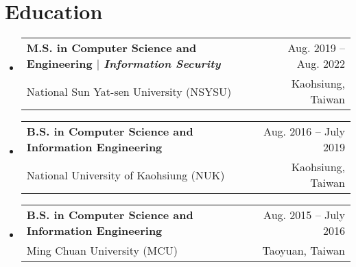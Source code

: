 \documentclass[A4,11pt]{article}
\makeatletter
\newcommand{\CVSubheading}[4]{
  \vspace{-2pt}\item
    \begin{tabular*}{0.97\textwidth}[t]{l@{\extracolsep{\fill}}r}
      \textbf{#1} & #2 \\
      \small#3 & \small #4 \\
    \end{tabular*}\vspace{-7pt}
}
\newcommand{\CVSubHeadingListStart}{\begin{itemize}[leftmargin=0.5cm, label={}]}
\newcommand{\CVSubHeadingListEnd}{\end{itemize}}
\makeatother
\begin{document}
\begin{comment}
This CV was written for specifically for positions I was applying for in
academia, and then modified to be a template.

A standard CV is about two pages long where as a resume in the US is one page.
sections can be added and removed here with this in mind. In my experience, 
education, and applicable work experience and skills are the most import things
to include on a resume. For a CV the Europass CV suggests the categories: Work
Experience, Education and Training, Language Skills, Digital Skills,
Communication and Interpersonal Skills, Conferences and Seminars, Creative Works
Driver's License, Hobbies and Interests, Honors and Awards, Management and
Leadership Skills, Networks and Memberships, Organizational Skills, Projects,
Publications, Recommendations, Social and Political Activities, Volunteering.

Your goal is to convey a who, what , when, where, why for every item you share. 
The who is obviously you, but I believe the rest should be done in that order.
For example below. An employer cares most about the degree held and typically 
less about the institution or where it is located (This is still good 
information though). Whatever order you choose be consistent throughout.
\end{comment}

\section{Education}
  \CVSubHeadingListStart
    \CVSubheading
      {M.S. in Computer Science and Engineering $|$ \emph{\small{Information Security}}}{Aug. 2019 -- Aug. 2022}
      {National Sun Yat-sen University (NSYSU)}{Kaohsiung, Taiwan}
    \CVSubheading
      {B.S. in Computer Science and Information Engineering}{Aug. 2016 -- July 2019}
      {National University of Kaohsiung (NUK)}{Kaohsiung, Taiwan}
    \CVSubheading
      {B.S. in Computer Science and Information Engineering}{Aug. 2015 -- July 2016}
      {Ming Chuan University (MCU)}{Taoyuan, Taiwan}
  \CVSubHeadingListEnd

\begin{comment}
  try to briefly explain what you did and why it is relevant to the position you
  are seeking
  \end{comment}
  
\end{document}
